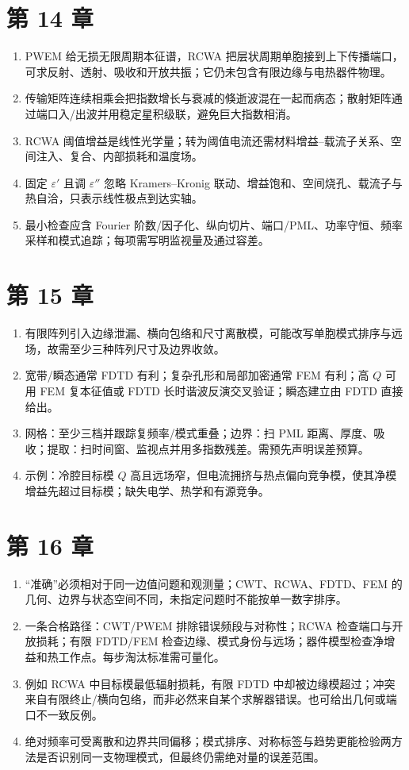 \section{第 14 章}
\begin{enumerate}
  \item PWEM 给无损无限周期本征谱，RCWA 把层状周期单胞接到上下传播端口，可求反射、透射、吸收和开放共振；它仍未包含有限边缘与电热器件物理。
  \item 传输矩阵连续相乘会把指数增长与衰减的倏逝波混在一起而病态；散射矩阵通过端口入/出波并用稳定星积级联，避免巨大指数相消。
  \item RCWA 阈值增益是线性光学量；转为阈值电流还需材料增益--载流子关系、空间注入、复合、内部损耗和温度场。
  \item 固定 $\varepsilon'$ 且调 $\varepsilon''$ 忽略 Kramers--Kronig 联动、增益饱和、空间烧孔、载流子与热自洽，只表示线性极点到达实轴。
  \item 最小检查应含 Fourier 阶数/因子化、纵向切片、端口/PML、功率守恒、频率采样和模式追踪；每项需写明监视量及通过容差。
\end{enumerate}

\section{第 15 章}
\begin{enumerate}
  \item 有限阵列引入边缘泄漏、横向包络和尺寸离散模，可能改写单胞模式排序与远场，故需至少三种阵列尺寸及边界收敛。
  \item 宽带/瞬态通常 FDTD 有利；复杂孔形和局部加密通常 FEM 有利；高 $Q$ 可用 FEM 复本征值或 FDTD 长时谐波反演交叉验证；瞬态建立由 FDTD 直接给出。
  \item 网格：至少三档并跟踪复频率/模式重叠；边界：扫 PML 距离、厚度、吸收；提取：扫时间窗、监视点并用多指数残差。需预先声明误差预算。
  \item 示例：冷腔目标模 $Q$ 高且远场窄，但电流拥挤与热点偏向竞争模，使其净模增益先超过目标模；缺失电学、热学和有源竞争。
\end{enumerate}

\section{第 16 章}
\begin{enumerate}
  \item “准确”必须相对于同一边值问题和观测量；CWT、RCWA、FDTD、FEM 的几何、边界与状态空间不同，未指定问题时不能按单一数字排序。
  \item 一条合格路径：CWT/PWEM 排除错误频段与对称性；RCWA 检查端口与开放损耗；有限 FDTD/FEM 检查边缘、模式身份与远场；器件模型检查净增益和热工作点。每步淘汰标准需可量化。
  \item 例如 RCWA 中目标模最低辐射损耗，有限 FDTD 中却被边缘模超过；冲突来自有限终止/横向包络，而非必然来自某个求解器错误。也可给出几何或端口不一致反例。
  \item 绝对频率可受离散和边界共同偏移；模式排序、对称标签与趋势更能检验两方法是否识别同一支物理模式，但最终仍需绝对量的误差范围。
\end{enumerate}

